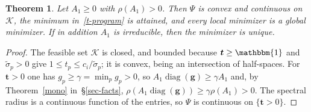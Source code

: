 \documentclass[11pt]{article}
\theoremstyle{plain}
\newtheorem{theorem}{Theorem}[section]
\theoremstyle{definition}
\theoremstyle{remark}
\numberwithin{equation}{section}
\numberwithin{figure}{section}
\numberwithin{table}{section}
\numberwithin{algorithm}{section}
\begin{document}
\begin{theorem}\label{global}
Let $A_1\ge 0$ with $\rho(A_1)>0$. Then $\Psi$ is convex and continuous
on $\mathcal{K}$, the minimum in~\eqref{t-program} is attained, and every local
minimizer is a global minimizer. If in addition $A_1$ is irreducible, then the
minimizer is unique.
\end{theorem}
\begin{proof}
The feasible set $\mathcal{K}$ is closed, and bounded because $\bm t\ge\mathbbm{1}$ and
$\widetilde\sigma_p>0$ give $1\le t_p\le c_i/\widetilde\sigma_p$; it is convex, being an
intersection of half-spaces. For $\bm t>0$ one has $g_p\ge\gamma=\min_p g_p>0$, so
$A_1\operatorname{diag}(\bm g)\ge\gamma A_1$ and, by Theorem~\ref{mono}
in~\S\ref{sec-facts}, $\rho\left(A_1\operatorname{diag}(\bm g)\right)\ge\gamma\rho(A_1)>0$.
The spectral radius is a continuous function of the entries, so $\Psi$ is
continuous on $\{\bm t>0\}$.


\end{proof}
\end{document}
